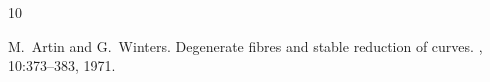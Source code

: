\begin{thebibliography}{10}

M.~Artin and G.~Winters.
\newblock Degenerate fibres and stable reduction of curves.
, 10:373--383, 1971.

\end{thebibliography}
